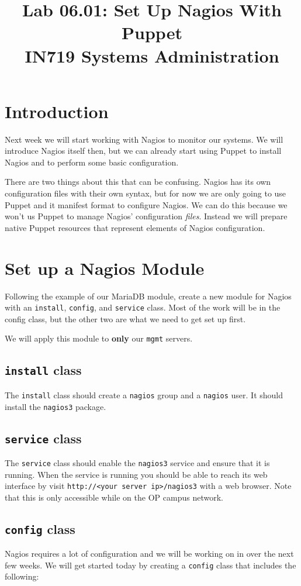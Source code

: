 \documentclass{article}   	%
\title{Lab 06.01:  Set Up Nagios With Puppet\\ IN719 Systems Administration}
\date{}							%
\begin{document}
\maketitle

\section*{Introduction}
Next week we will start working with Nagios to monitor our systems. We will introduce Nagios itself then, but we can already start using Puppet to install Nagios and to perform some basic configuration.

There are two things about this that can be confusing. Nagios has its own configuration files with their own syntax, but for now we are only going to use Puppet and it manifest format to configure Nagios. We can do this because we won't us Puppet to manage Nagios' configuration \emph{files}. Instead we will prepare native Puppet resources that represent elements of Nagios configuration.


\section{Set up a Nagios Module}
Following the example of our MariaDB module, create a new module for Nagios with an \texttt{install}, \texttt{config}, and \texttt{service} class. Most of the work will be in the config class, but the other two are what we need to get set up first.

We will apply this module to \textbf{only} our \texttt{mgmt} servers.

\subsection{\texttt{install} class}
The \texttt{install} class should create a \texttt{nagios} group and a \texttt{nagios} user. It should install the \texttt{nagios3} package.

\subsection{\texttt{service} class}
The \texttt{service} class should enable the \texttt{nagios3} service and ensure that it is running. When the service is running you should be able to reach its web interface by visit \texttt{http://<your server ip>/nagios3} with a web browser. Note that this is only accessible while on the OP campus network.

\subsection{\texttt{config} class}
Nagios requires a lot of configuration and we will be working on in over the next few weeks. We will get started today by creating a \texttt{config} class that includes the following: 
\end{document}
